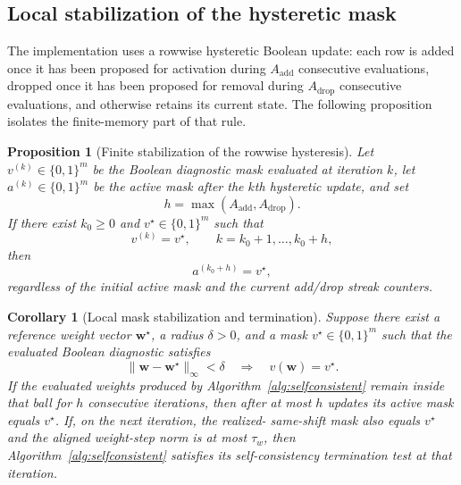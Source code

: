 \documentclass[preprint,12pt]{elsarticle}
\newtheorem{proposition}{Proposition}
\newtheorem{corollary}{Corollary}
\newcommand{\weights}{\mathbf{w}}
\begin{document}
\subsection{Local stabilization of the hysteretic mask}
\label{app:hysteresis_stabilization}
The implementation uses a rowwise hysteretic Boolean update: each row is added
once it has been proposed for activation during $A_{\mathrm{add}}$
consecutive evaluations, dropped once it has been proposed for removal during
$A_{\mathrm{drop}}$ consecutive evaluations, and otherwise retains its current
state. The following proposition isolates the finite-memory part of that rule.

\begin{proposition}[Finite stabilization of the rowwise hysteresis]
\label{prop:hysteresis_stabilization}
Let $v^{(k)}\in\{0,1\}^m$ be the Boolean diagnostic mask evaluated at
iteration $k$, let $a^{(k)}\in\{0,1\}^m$ be the active mask after the $k$th
hysteretic update, and set
\begin{equation}
    h=\max(A_{\mathrm{add}},A_{\mathrm{drop}}).
\end{equation}
If there exist $k_0\ge 0$ and $v^\star\in\{0,1\}^m$ such that
\begin{equation}
    v^{(k)}=v^\star,
    \qquad k=k_0+1,\dots,k_0+h,
\end{equation}
then
\begin{equation}
    a^{(k_0+h)}=v^\star,
\end{equation}
regardless of the initial active mask and the current add/drop streak counters.
\end{proposition}

\begin{corollary}[Local mask stabilization and termination]
\label{cor:hysteresis_stabilization}
Suppose there exist a reference weight vector $\weights^\star$, a radius
$\delta>0$, and a mask $v^\star\in\{0,1\}^m$ such that the evaluated Boolean
diagnostic satisfies
\begin{equation}
    \lVert \weights-\weights^\star\rVert_\infty<\delta
    \quad\Longrightarrow\quad
    v(\weights)=v^\star.
\end{equation}
If the evaluated weights produced by Algorithm~\ref{alg:selfconsistent} remain
inside that ball for $h$ consecutive iterations, then after at most $h$ updates
its active mask equals $v^\star$. If, on the next iteration, the realized-
same-shift mask also equals $v^\star$ and the aligned weight-step norm is at
most $\tau_w$, then Algorithm~\ref{alg:selfconsistent} satisfies its
self-consistency termination test at that iteration.
\end{corollary}
\end{document}
